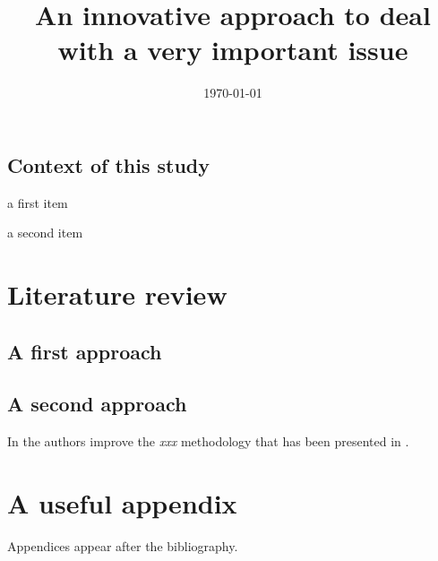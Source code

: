 \documentclass{gsemthesis}
\title{An innovative approach to deal with a very important issue}
\date{\today}
\begin{document}
\printcoverpage

\printfrontmatter


\startintroduction 

\lipsum[1]

\section*{Context of this study}
\label{sec:context}

\lipsum[2]
\begin{itemize*}
\item a first item
\item a second item
\end{itemize*}
\lipsum[3-29]



\chapter{Literature review}
\label{ch:lt}

\lipsum[30]

\section{A first approach}

\lipsum[31-50]

\section{A second approach}

\lipsum[51-70]

In \textcite{keyref2} the authors improve the \emph{xxx} methodology that has been presented in \autocite{keyref1}.




\startconclusion

\lipsum[100-109]







\listoftables
\listoffigures


\newpage
\printbibliography


\appendix
\chapter{A useful appendix}

Appendices appear after the bibliography. 
\end{document}
